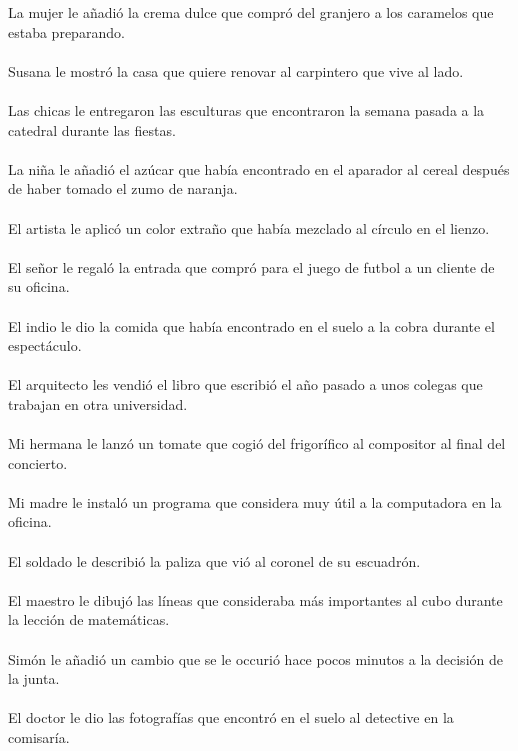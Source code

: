 La mujer le a\~{n}adi\'{o} la crema dulce que compr\'{o} del granjero a los caramelos que estaba preparando.	\\	\\
Susana le mostr\'{o} la casa que quiere renovar al carpintero que vive al lado.	\\	\\
Las chicas le entregaron las esculturas que encontraron la semana pasada a la catedral durante las fiestas.	\\	\\
La ni\~{n}a le a\~{n}adi\'{o} el az\'{u}car que hab\'{i}a encontrado en el aparador al cereal después de haber tomado el zumo de naranja.	\\	\\
El artista le aplic\'{o} un color extra\~{n}o que hab\'{i}a mezclado al c\'{i}rculo en el lienzo.	\\	\\
El se\~{n}or le regal\'{o} la entrada que compr\'{o} para el juego de futbol a un cliente de su oficina.	\\	\\
El indio le dio la comida que hab\'{i}a encontrado en el suelo a la cobra durante el espect\'{a}culo.	\\	\\
El arquitecto les vendi\'{o} el libro que escribi\'{o} el a\~{n}o pasado a unos colegas que trabajan en otra universidad.	\\	\\
Mi hermana le lanz\'{o} un tomate que cogi\'{o} del frigor\'{i}fico al compositor al final del concierto.	\\	\\
Mi madre le instal\'{o} un programa que considera muy \'{u}til a la computadora en la oficina.	\\	\\
El soldado le describi\'{o} la paliza que vi\'{o} al coronel de su escuadr\'{o}n.	\\	\\
El maestro le dibuj\'{o} las l\'{i}neas que consideraba m\'{a}s importantes al cubo durante la lecci\'{o}n de matem\'{a}ticas.	\\	\\
Sim\'{o}n le a\~{n}adi\'{o} un cambio que se le occuri\'{o} hace pocos minutos a la decisi\'{o}n de la junta.	\\	\\
El doctor le dio las fotograf\'{i}as que encontr\'{o} en el suelo al detective en la comisar\'{i}a.	\\	\\
